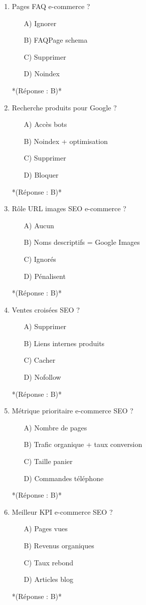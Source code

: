 \documentclass[12pt,a4paper,twoside]{report}
\begin{document}
\begin{enumerate}
\item Pages FAQ e-commerce ?
\begin{itemize}
\item[A)] Ignorer
\item[B)] FAQPage schema
\item[C)] Supprimer
\item[D)] Noindex
\end{itemize}
*(Réponse : B)*

\item Recherche produits pour Google ?
\begin{itemize}
\item[A)] Accès bots
\item[B)] Noindex + optimisation
\item[C)] Supprimer
\item[D)] Bloquer
\end{itemize}
*(Réponse : B)*

\item Rôle URL images SEO e-commerce ?
\begin{itemize}
\item[A)] Aucun
\item[B)] Noms descriptifs = Google Images
\item[C)] Ignorés
\item[D)] Pénalisent
\end{itemize}
*(Réponse : B)*

\item Ventes croisées SEO ?
\begin{itemize}
\item[A)] Supprimer
\item[B)] Liens internes produits
\item[C)] Cacher
\item[D)] Nofollow
\end{itemize}
*(Réponse : B)*

\item Métrique prioritaire e-commerce SEO ?
\begin{itemize}
\item[A)] Nombre de pages
\item[B)] Trafic organique + taux conversion
\item[C)] Taille panier
\item[D)] Commandes téléphone
\end{itemize}
*(Réponse : B)*

\item Meilleur KPI e-commerce SEO ?
\begin{itemize}
\item[A)] Pages vues
\item[B)] Revenus organiques
\item[C)] Taux rebond
\item[D)] Articles blog
\end{itemize}
*(Réponse : B)*


\end{enumerate}
\end{document}
